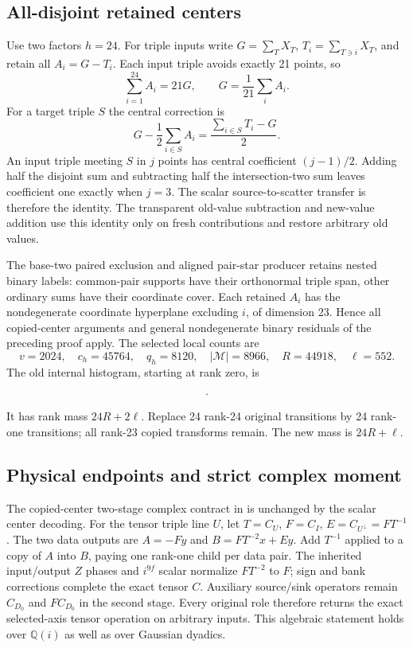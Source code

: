 \subsection{All-disjoint retained centers}
Use two factors $h=24$. For triple inputs write $G=\sum_TX_T$,
$T_i=\sum_{T\ni i}X_T$, and retain all $A_i=G-T_i$.
Each input triple avoids exactly 21 points, so
\[
 \sum_{i=1}^{24}A_i=21G,\qquad G=\frac1{21}\sum_i A_i.
\]
For a target triple $S$ the central correction is
\[
 G-\frac12\sum_{i\in S}A_i
       =\frac{\sum_{i\in S}T_i-G}{2}.
\]
An input triple meeting $S$ in $j$ points has central coefficient
$(j-1)/2$. Adding half the disjoint sum and subtracting half the
intersection-two sum leaves coefficient one exactly when $j=3$.
The scalar source-to-scatter transfer is therefore the identity.
The transparent old-value subtraction and new-value addition use this
identity only on fresh contributions and restore arbitrary old values.

The base-two paired exclusion and aligned pair-star producer retains
nested binary labels: common-pair supports have their orthonormal triple
span, other ordinary sums have their coordinate cover. Each retained
$A_i$ has the nondegenerate coordinate hyperplane excluding $i$,
of dimension 23. Hence all copied-center arguments and general
nondegenerate binary residuals of the preceding proof apply. The
selected local counts are
\[
 v=2024,\quad c_h=45764,\quad q_h=8120,\quad
 |\mathcal M|=8966,\quad R=44918,\quad\ell=552.
\]
The old internal histogram, starting at rank zero, is
\begin{small}\begin{align*}
[&8930,49042,30844,15972,11883,8272,6399,4356,6682,2263,\\
 &5109,1808,5317,1733,5391,1757,4908,3290,6233,4363,\\
 &4056,264,564,24,24].
\end{align*}\end{small}
It has rank mass $24R+2\ell$. Replace 24 rank-24 original transitions
by 24 rank-one transitions; all rank-23 copied transforms remain.
The new mass is $24R+\ell$.

\subsection{Physical endpoints and strict complex moment}
The copied-center two-stage complex contract in
 is unchanged by the scalar
center decoding. For the tensor triple line $U$, let
$T=C_U$, $F=C_I$, $E=C_{U^\perp}=FT^{-1}$.
The two data outputs are $A=-Fy$ and $B=FT^{-2}x+Ey$.
Add $T^{-1}$ applied to a copy of $A$ into $B$, paying one rank-one
child per data pair. The inherited input/output $Z$ phases and
$i^{9f}$ scalar normalize $FT^{-2}$ to $F$; sign and bank corrections
complete the exact tensor $C$. Auxiliary source/sink operators remain
$C_{D_0}$ and $FC_{D_0}$ in the second stage. Every original role
therefore returns the exact selected-axis tensor operation on arbitrary
inputs. This algebraic statement holds over $\mathbb Q(i)$ as well as
over Gaussian dyadics.

